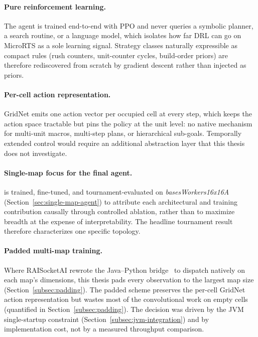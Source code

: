 \paragraph*{Pure reinforcement learning.}
The agent is trained end-to-end with PPO and never queries a symbolic planner, a search routine, or a language model, which isolates how far DRL can go on MicroRTS as a sole learning signal. Strategy classes naturally expressible as compact rules (rush counters, unit-counter cycles, build-order priors) are therefore rediscovered from scratch by gradient descent rather than injected as priors.

\paragraph*{Per-cell action representation.}
GridNet emits one action vector per occupied cell at every step, which keeps the action space tractable but pins the policy at the unit level: no native mechanism for multi-unit macros, multi-step plans, or hierarchical sub-goals. Temporally extended control would require an additional abstraction layer that this thesis does not investigate.

\paragraph*{Single-map focus for the final agent.}
 is trained, fine-tuned, and tournament-evaluated on \emph{basesWorkers16x16A} (Section~\ref{sec:single-map-agent}) to attribute each architectural and training contribution causally through controlled ablation, rather than to maximize breadth at the expense of interpretability. The headline tournament result therefore characterizes one specific topology.

\paragraph*{Padded multi-map training.}
Where RAISocketAI rewrote the Java--Python bridge~\cite{goodfriendCompetitionWinningDeep2024} to dispatch natively on each map's dimensions, this thesis pads every observation to the largest map size (Section~\ref{subsec:padding}). The padded scheme preserves the per-cell GridNet action representation but wastes most of the convolutional work on empty cells (quantified in Section~\ref{subsec:padding}). The decision was driven by the JVM single-startup constraint (Section~\ref{subsec:jvm-integration}) and by implementation cost, not by a measured throughput comparison.

